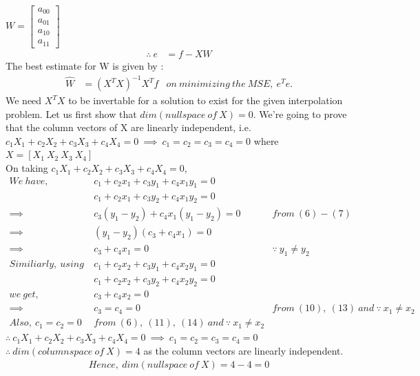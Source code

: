 \documentclass[a4paper,fleqn,11pt]{article}
\theoremstyle{mytheor}
\begin{document}
	$W = \begin{bmatrix}
			a_{00} \\
			a_{01} \\
			a_{10} \\
			a_{11}	
		 \end{bmatrix}$
\begin{align}
\therefore\ e & = f - XW
\end{align}
The best estimate for W is given by : 
\begin{align}
\hat{W} & = (X^TX)^{-1}X^Tf & on\ minimizing\ the\ MSE,\ e^Te.
\end{align}
We need $X^TX$ to be invertable for a solution to exist for the given interpolation problem.
Let us first show that $dim(nullspace\ of\ X) = 0$. We're going to prove that the column vectors of X are linearly independent, i.e. $c_1X_1 + c_2X_2 + c_3X_3 + c_4X_4 = 0\ \implies\ c_1 = c_2 = c_3 = c_4 = 0$ where $X = [X_1\ X_2\ X_3\ X_4]$ \\
On taking $c_1X_1 + c_2X_2 + c_3X_3 + c_4X_4 = 0$,
\begin{align}
We\ have,\ & c_1 + c_2x_1 + c_3y_1 + c_4x_1y_1 = 0 \\
& c_1 + c_2x_1 + c_3y_2 + c_4x_1y_2 = 0 \\
\implies\ & c_3(y_1 - y_2) + c_4x_1(y_1 - y_2) = 0\ & from\ (6) - (7) \\
\implies\ & (y_1 - y_2)(c_3 + c_4x_1) = 0 \\
\implies\ & c_3 + c_4x_1 = 0\ & \because\ y_1 \neq y_2 \\
Similiarly,\ using\ & c_1 + c_2x_2 + c_3y_1 + c_4x_2y_1 = 0 \\
& c_1 + c_2x_2 + c_3y_2 + c_4x_2y_2 = 0 \\
we\ get,\ & c_3 + c_4x_2 = 0 \\
\implies\ & c_3 = c_4 = 0\ & from\ (10),\ (13)\ and\ \because\ x_1 \neq x_2 \\  
Also, \ c_1 = c_2 = 0\ & from\ (6),\ (11),\ (14)\ and\ \because\ x_1 \neq x_2
\end{align}
$\therefore\ c_1X_1 + c_2X_2 + c_3X_3 + c_4X_4 = 0\ \implies\ c_1 = c_2 = c_3 = c_4 = 0$ \\
$\therefore\ dim(columnspace\ of\ X) = 4$ as the column vectors are linearly independent.
\begin{align}
Hence,\ dim(nullspace\ of\ X) = 4 - 4 = 0
\end{align}
\end{document}
